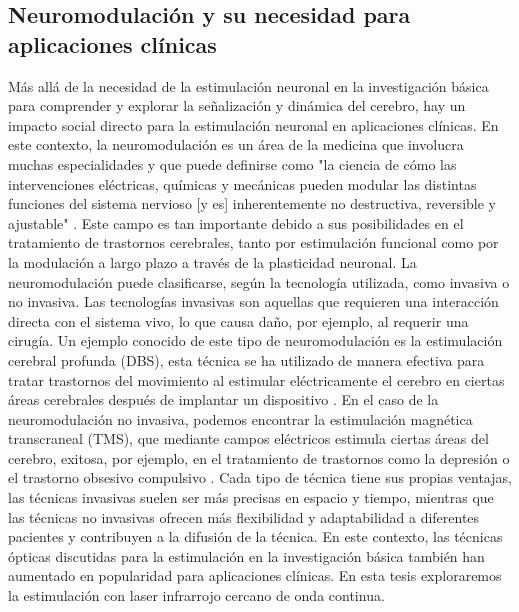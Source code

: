 \subsection{Neuromodulación y su necesidad para aplicaciones clínicas}

Más allá de la necesidad de la estimulación neuronal en la investigación básica para comprender y explorar la señalización y dinámica del cerebro, hay un impacto social directo para la estimulación neuronal en aplicaciones clínicas. En este contexto, la neuromodulación es un área de la medicina que involucra muchas especialidades y que puede definirse como "la ciencia de cómo las intervenciones eléctricas, químicas y mecánicas pueden modular las distintas funciones del sistema nervioso [y es] inherentemente no destructiva, reversible y ajustable" \parencite{krames_neuromodulation_2009}. Este campo es tan importante debido a sus posibilidades en el tratamiento de trastornos cerebrales, tanto por estimulación funcional como por la modulación a largo plazo a través de la plasticidad neuronal. La neuromodulación puede clasificarse, según la tecnología utilizada, como invasiva o no invasiva. Las tecnologías invasivas son aquellas que requieren una interacción directa con el sistema vivo, lo que causa daño, por ejemplo, al requerir una cirugía. Un ejemplo conocido de este tipo de neuromodulación es la estimulación cerebral profunda (DBS), esta técnica se ha utilizado de manera efectiva para tratar trastornos del movimiento al estimular eléctricamente el cerebro en ciertas áreas cerebrales después de implantar un dispositivo \parencite{limousin_longterm_2019, hariz_deep_2022}. En el caso de la neuromodulación no invasiva, podemos encontrar la estimulación magnética transcraneal (TMS), que mediante campos eléctricos estimula ciertas áreas del cerebro, exitosa, por ejemplo, en el tratamiento de  trastornos como la depresión o el trastorno obsesivo compulsivo \parencite{valero-cabre_transcranial_2017, clarke_patients_2018}. Cada tipo de técnica tiene sus propias ventajas, las técnicas invasivas suelen ser más precisas en espacio y tiempo, mientras que las técnicas no invasivas ofrecen más flexibilidad y adaptabilidad a diferentes pacientes y contribuyen a la difusión de la técnica. En este contexto, las técnicas ópticas discutidas para la estimulación en la investigación básica también han aumentado en popularidad para aplicaciones clínicas. En esta tesis exploraremos la estimulación con laser infrarrojo cercano de onda continua. 
